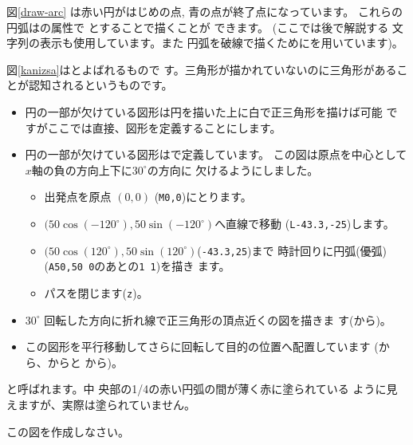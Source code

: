 図\ref{draw-arc}
は赤い円がはじめの点, 青の点が終了点になっています。
これらの円弧はの属性で
とすることで描くことが
できます。
{}
{\noexpand\newline\noexpand\small\noexpand\mdseries(ここでは後で解説する
文字列の表示も使用しています。また
円弧を破線で描くために\noexpand{}を用いています)。}

図\ref{kanizsa}はとよばれるもので
す。三角形が描かれていないのに三角形があることが認知されるというものです。
\begin{itemize}
 \item 円の一部が欠けている図形は円を描いた上に白で正三角形を描けば可能
       ですがここでは直接、図形を定義することにします。
 \item 円の一部が欠けている図形はで定義しています。
       この図は原点を中心として$x$軸の負の方向上下に$30^{\circ}$の方向に
       欠けるようにしました。
\begin{itemize}
 \item 出発点を原点 $(0,0)$ (\texttt{M0,0})にとります。
 \item $(50\cos(-120^{\circ}),50\sin(-120^{\circ})$へ直線で移動
       (\texttt{L-43.3,-25})します。
 \item $(50\cos(120^{\circ}),50\sin(120^{\circ})$(\texttt{-43.3,25})まで
       時計回りに円弧(優弧)(\texttt{A50,50 0}のあとの\texttt{1 1})を描き
       ます。
 \item パスを閉じます(\texttt{z})。
\end{itemize}
 \item $30^{\circ}$ 回転した方向に折れ線で正三角形の頂点近くの図を描きま
       す(から)。
 \item この図形を平行移動してさらに回転して目的の位置へ配置しています
  (から、からと
  から)。
\end{itemize}
{と呼ばれます。中
 央部の1/4の赤い円弧の間が薄く赤に塗られている
 ように見えますが、実際は塗られていません。\par
 この図を作成しなさい。}
 \fi
\ifSeminor
\else
